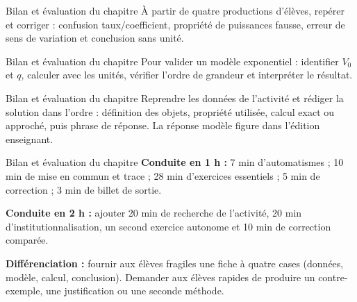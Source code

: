 \documentclass[aspectratio=169,10pt]{beamer}
\begin{document}
\begin{frame}{Bilan et évaluation du chapitre}
À partir de quatre productions d'élèves, repérer et corriger : confusion taux/coefficient, propriété de puissances fausse, erreur de sens de variation et conclusion sans unité.
\end{frame}
\begin{frame}{Bilan et évaluation du chapitre}
Pour valider un modèle exponentiel : identifier \(V_0\) et \(q\), calculer avec les unités, vérifier l'ordre de grandeur et interpréter le résultat.
\end{frame}
\begin{frame}{Bilan et évaluation du chapitre}
Reprendre les données de l'activité et rédiger la solution dans l'ordre : définition des objets, propriété utilisée, calcul exact ou approché, puis phrase de réponse. La réponse modèle figure dans l'édition enseignant.
\end{frame}
\begin{frame}{Bilan et évaluation du chapitre}
\textbf{Conduite en 1 h :} 7 min d'automatismes ; 10 min de mise en commun et trace ; 28 min d'exercices essentiels ; 5 min de correction ; 3 min de billet de sortie.

\textbf{Conduite en 2 h :} ajouter 20 min de recherche de l'activité, 20 min d'institutionnalisation, un second exercice autonome et 10 min de correction comparée.

\textbf{Différenciation :} fournir aux élèves fragiles une fiche à quatre cases (données, modèle, calcul, conclusion). Demander aux élèves rapides de produire un contre-exemple, une justification ou une seconde méthode.
\end{frame}
\end{document}
